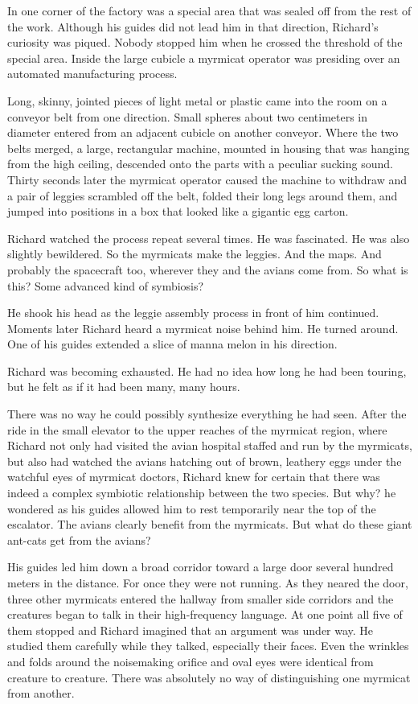 \documentclass[]{article}
\begin{document}
{{In one corner of the factory was a special area that was sealed off from the rest of the work.  Although his guides did not lead him in that direction, Richard’s curiosity was piqued.  Nobody stopped him when he crossed the threshold of the special area.  Inside the large cubicle a myrmicat operator was presiding over an automated manufacturing process.

Long, skinny, jointed pieces of light metal or plastic came into the room on a conveyor belt from one direction.  Small spheres about two centimeters in diameter entered from an adjacent cubicle on another conveyor.  Where the two belts merged, a large, rectangular machine, mounted in housing that was hanging from the high ceiling, descended onto the parts with a peculiar sucking sound.  Thirty seconds later the myrmicat operator caused the machine to withdraw and a pair of leggies scrambled off the belt, folded their long legs around them, and jumped into positions in a box that looked like a gigantic egg carton.

Richard watched the process repeat several times.  He was fascinated.  He was also slightly bewildered.  So the myrmicats make the leggies.  And the maps.  And probably the spacecraft too, wherever they and the avians come from.  So what is this? Some advanced kind of symbiosis?

He shook his head as the leggie assembly process in front of him continued.  Moments later Richard heard a myrmicat noise behind him.  He turned around.  One of his guides extended a slice of manna melon in his direction.

Richard was becoming exhausted.  He had no idea how long he had been touring, but he felt as if it had been many, many hours.

There was no way he could possibly synthesize everything he had seen.  After the ride in the small elevator to the upper reaches of the myrmicat region, where Richard not only had visited the avian hospital staffed and run by the myrmicats, but also had watched the avians hatching out of brown, leathery eggs under the watchful eyes of myrmicat doctors, Richard knew for certain that there was indeed a complex symbiotic relationship between the two species.  But why? he wondered as his guides allowed him to rest temporarily near the top of the escalator.  The avians clearly benefit from the myrmicats.  But what do these giant ant-cats get from the avians?

His guides led him down a broad corridor toward a large door several hundred meters in the distance.  For once they were not running.  As they neared the door, three other myrmicats entered the hallway from smaller side corridors and the creatures began to talk in their high-frequency language.  At one point all five of them stopped and Richard imagined that an argument was under way.  He studied them carefully while they talked, especially their faces.  Even the wrinkles and folds around the noisemaking orifice and oval eyes were identical from creature to creature.  There was absolutely no way of distinguishing one myrmicat from another.

}}
\end{document}

